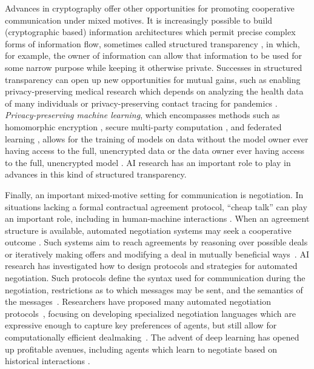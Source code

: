 \documentclass[11pt, a4paper, logo, onecolumn, nonumbering]{deepmind}
\begin{document}
Advances in cryptography offer other opportunities for promoting cooperative communication under mixed motives. It is increasingly possible to build (cryptographic based) information architectures which permit precise complex forms of information flow, sometimes called structured transparency \cite{Traskstructuredtransparency},  in which, for example, the owner of information can allow that information to be used for some narrow purpose while keeping it otherwise private. Successes in structured transparency can open up new opportunities for mutual gains, such as enabling privacy-preserving medical research which depends on analyzing the health data of many individuals \cite{Traskstructuredtransparency} or privacy-preserving contact tracing for pandemics \cite{shevlane2019contact}. \textit{Privacy-preserving machine learning}, which encompasses methods such as homomorphic encryption \cite{Graepel2012Confidential, gentry2009fully}, secure multi-party computation \cite{Mohassel2017secure}, and federated learning \cite{McMahan2017communication}, allows for the training of models on data without the model owner ever having access to the full, unencrypted data or the data owner ever having access to the full, unencrypted model \cite{Graepel2012Confidential, Traskstructuredtransparency}. AI research has an important role to play in advances in this kind of structured transparency. 



Finally, an important mixed-motive setting for communication is negotiation. In situations lacking a formal contractual agreement protocol, ``cheap talk'' \cite{Crawford1982Strategic} can play an important role, including in human-machine interactions \cite{crandall2018cooperating}. When an agreement structure is available, automated negotiation systems may seek a cooperative outcome \cite{rosenschein1994rules,jennings2001automated,faratin2002using}. Such systems aim to reach agreements by reasoning over possible deals or iteratively making offers and modifying a deal in mutually beneficial ways~\cite{kraus1997negotiation,matos1998determining,bichler2003towards}. AI research has investigated how to design protocols and strategies for automated negotiation. Such protocols define the syntax used for communication during the negotiation, restrictions as to which messages may be sent, and the semantics of the messages~\cite{smith1980contract,chang1994speech}. Researchers have proposed many automated negotiation protocols~\cite{aknine2004extended,ito2007multi}, focusing on developing specialized negotiation languages which are expressive enough to capture key preferences of agents, but still allow for computationally efficient dealmaking~\cite{sidner1994artificial,mueller1996negotiation,wooldridge2000languages}. The advent of deep learning has opened up profitable avenues, including agents which learn to negotiate based on historical interactions \cite{oliver1996machine,narayanan2006learning,lewis2017deal}.   
\end{document}
